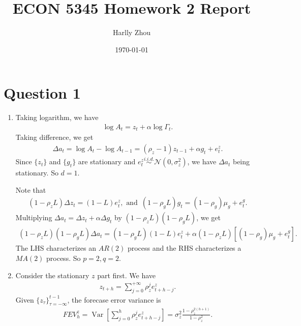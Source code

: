 \documentclass[12pt]{article}
\title{ECON 5345 Homework 2 Report}
\author{Harlly Zhou}
\date{\today}
\begin{document}
\maketitle

\section*{Question 1}
\begin{enumerate}[label=\alph*.]
   \item Taking logarithm, we have
   \begin{align*}
      \log A_t = z_t + \alpha \log \Gamma_t.
   \end{align*}
   Taking difference, we get
   \begin{align*}
      \Delta a_t = \log A_t - \log A_{t-1} =  (\rho_z - 1) z_{t-1} + \alpha g_t + e_t^z.
   \end{align*}
   Since $\{z_t\}$ and $\{g_t\}$ are stationary and $e_t^z \overset{i.i.d.}{\sim} \mathcal{N}(0, \sigma_z^2)$, we have $\Delta a_t$ being stationary. So $d=1$.

   Note that
   \begin{align*}
      (1-\rho_z L) \Delta z_t = (1-L) e_t^z, \text{ and }\, (1-\rho_g L) g_t = (1-\rho_g) \mu_g + e_t^g.
   \end{align*}
   Multiplying $\Delta a_t = \Delta z_t + \alpha \Delta g_t$ by $(1-\rho_z L)(1-\rho_g L)$, we get
   \begin{align}\label{eq:arima(2,1,2)}
      (1-\rho_z L)(1-\rho_g L) \Delta a_t = (1-\rho_g L) (1-L) e_t^z + \alpha (1-\rho_z L)[(1-\rho_g)\mu_g + e_t^g].
   \end{align}
   The LHS characterizes an $AR(2)$ process and the RHS characterizes a $MA(2)$ process. So $p=2, q=2$.

   \newpage

   \item Consider the stationary $z$ part first. We have
   \begin{align*}
      z_{t+h} = \sum_{j=0}^{+\infty} \rho_z^j e_{t+h-j}^z.
   \end{align*}
   Given $\{z_\tau\}_{\tau=-\infty}^{t-1}$, the forecase error variance is
   \begin{align*}
      FEV_h^z = \operatorname{Var}\left[\sum_{j=0}^h \rho_z^j e_{t+h-j}^z\right] = \sigma_z^2 \frac{1-\rho_z^{2(h+1)}}{1-\rho_z^2}.
   \end{align*}


\end{enumerate}
\end{document}
